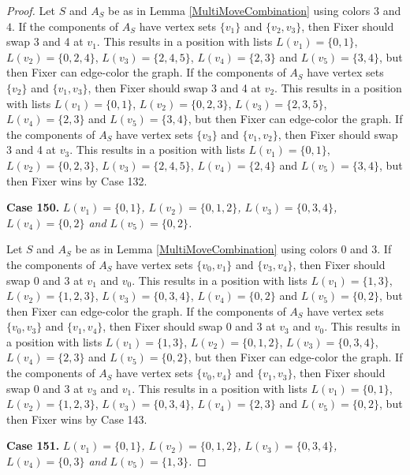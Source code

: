 \documentclass[12pt]{amsart}
\theoremstyle{plain}
\theoremstyle{definition}
\theoremstyle{remark}
\begin{document}
\begin{proof}
Let $S$ and $A_S$ be as in Lemma \ref{MultiMoveCombination} using colors $3$ and $4$. If the components of $A_S$ have vertex sets $\{v_1\}$ and $\{v_2, v_3\}$, then Fixer should swap 3 and 4 at $v_1$. This results in a position with lists $L(v_1) = \{0, 1\}$, $L(v_2) = \{0, 2, 4\}$, $L(v_3) = \{2, 4, 5\}$, $L(v_4) = \{2, 3\}$ and $L(v_5) = \{3, 4\}$, but then Fixer can edge-color the graph.
If the components of $A_S$ have vertex sets $\{v_2\}$ and $\{v_1, v_3\}$, then Fixer should swap 3 and 4 at $v_2$. This results in a position with lists $L(v_1) = \{0, 1\}$, $L(v_2) = \{0, 2, 3\}$, $L(v_3) = \{2, 3, 5\}$, $L(v_4) = \{2, 3\}$ and $L(v_5) = \{3, 4\}$, but then Fixer can edge-color the graph.
If the components of $A_S$ have vertex sets $\{v_3\}$ and $\{v_1, v_2\}$, then Fixer should swap 3 and 4 at $v_3$. This results in a position with lists $L(v_1) = \{0, 1\}$, $L(v_2) = \{0, 2, 3\}$, $L(v_3) = \{2, 4, 5\}$, $L(v_4) = \{2, 4\}$ and $L(v_5) = \{3, 4\}$, but then Fixer wins by Case 132.

\noindent\textbf{Case 150.  }\textit{$L(v_1) = \{0, 1\}$, $L(v_2) = \{0, 1, 2\}$, $L(v_3) = \{0, 3, 4\}$, $L(v_4) = \{0, 2\}$ and $L(v_5) = \{0, 2\}$.}

Let $S$ and $A_S$ be as in Lemma \ref{MultiMoveCombination} using colors $0$ and $3$. If the components of $A_S$ have vertex sets $\{v_0, v_1\}$ and $\{v_3, v_4\}$, then Fixer should swap 0 and 3 at $v_1$ and $v_0$. This results in a position with lists $L(v_1) = \{1, 3\}$, $L(v_2) = \{1, 2, 3\}$, $L(v_3) = \{0, 3, 4\}$, $L(v_4) = \{0, 2\}$ and $L(v_5) = \{0, 2\}$, but then Fixer can edge-color the graph.
If the components of $A_S$ have vertex sets $\{v_0, v_3\}$ and $\{v_1, v_4\}$, then Fixer should swap 0 and 3 at $v_3$ and $v_0$. This results in a position with lists $L(v_1) = \{1, 3\}$, $L(v_2) = \{0, 1, 2\}$, $L(v_3) = \{0, 3, 4\}$, $L(v_4) = \{2, 3\}$ and $L(v_5) = \{0, 2\}$, but then Fixer can edge-color the graph.
If the components of $A_S$ have vertex sets $\{v_0, v_4\}$ and $\{v_1, v_3\}$, then Fixer should swap 0 and 3 at $v_3$ and $v_1$. This results in a position with lists $L(v_1) = \{0, 1\}$, $L(v_2) = \{1, 2, 3\}$, $L(v_3) = \{0, 3, 4\}$, $L(v_4) = \{2, 3\}$ and $L(v_5) = \{0, 2\}$, but then Fixer wins by Case 143.

\noindent\textbf{Case 151.  }\textit{$L(v_1) = \{0, 1\}$, $L(v_2) = \{0, 1, 2\}$, $L(v_3) = \{0, 3, 4\}$, $L(v_4) = \{0, 3\}$ and $L(v_5) = \{1, 3\}$.}


\end{proof}
\end{document}
